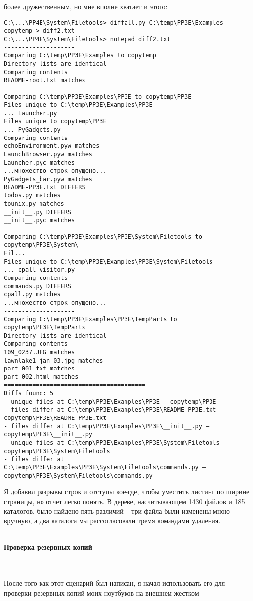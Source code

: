 \documentclass[12pt]{article}
\begin{document}
более дружественным, но мне вполне хватает и этого:
\begin{verbatim}
C:\...\PP4E\System\Filetools> diffall.py C:\temp\PP3E\Examples
copytemp > diff2.txt
C:\...\PP4E\System\Filetools> notepad diff2.txt
--------------------
Comparing C:\temp\PP3E\Examples to copytemp
Directory lists are identical
Comparing contents
README-root.txt matches
--------------------
Comparing C:\temp\PP3E\Examples\PP3E to copytemp\PP3E
Files unique to C:\temp\PP3E\Examples\PP3E
... Launcher.py
Files unique to copytemp\PP3E
... PyGadgets.py
Comparing contents
echoEnvironment.pyw matches
LaunchBrowser.pyw matches
Launcher.pyc matches
...множество строк опущено...
PyGadgets_bar.pyw matches
README-PP3E.txt DIFFERS
todos.py matches
tounix.py matches
__init__.py DIFFERS
__init__.pyc matches
--------------------
Comparing C:\temp\PP3E\Examples\PP3E\System\Filetools to copytemp\PP3E\System\
Fil...
Files unique to C:\temp\PP3E\Examples\PP3E\System\Filetools
... cpall_visitor.py
Comparing contents
commands.py DIFFERS
cpall.py matches
...множество строк опущено...
--------------------
Comparing C:\temp\PP3E\Examples\PP3E\TempParts to copytemp\PP3E\TempParts
Directory lists are identical
Comparing contents
109_0237.JPG matches
lawnlake1-jan-03.jpg matches
part-001.txt matches
part-002.html matches
========================================
Diffs found: 5
- unique files at C:\temp\PP3E\Examples\PP3E - copytemp\PP3E
- files differ at C:\temp\PP3E\Examples\PP3E\README-PP3E.txt –
copytemp\PP3E\README-PP3E.txt
- files differ at C:\temp\PP3E\Examples\PP3E\__init__.py –
copytemp\PP3E\__init__.py
- unique files at C:\temp\PP3E\Examples\PP3E\System\Filetools –
copytemp\PP3E\System\Filetools
- files differ at C:\temp\PP3E\Examples\PP3E\System\Filetools\commands.py –
copytemp\PP3E\System\Filetools\commands.py
\end{verbatim}
Я добавил разрывы строк и отступы кое-где, чтобы уместить листинг
по ширине страницы, но отчет легко понять. В дереве, насчитывающем
1430 файлов и 185 каталогов, было найдено пять различий – три файла
были изменены мною вручную, а два каталога мы рассогласовали тремя командами удаления. \\
\\
\begin{large}
\textbf{Проверка резервных копий}
\end{large}
\\
\\
После того как этот сценарий был написан, я начал использовать его
для проверки резервных копий моих ноутбуков на внешнем жестком
\end{document}
